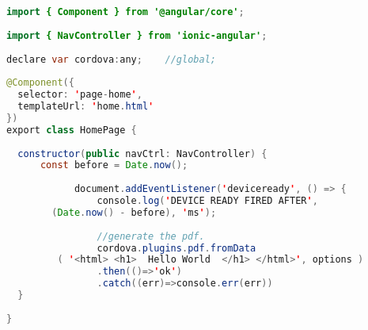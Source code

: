 \begin{lstlisting}[language= Java, frame=single, label={example:pdf-gen}, caption= Penggunaan \textit{plugin} pada Ionic dan Angular]
import { Component } from '@angular/core';
 
import { NavController } from 'ionic-angular';
 
declare var cordova:any;    //global;
 
@Component({
  selector: 'page-home',
  templateUrl: 'home.html'
})
export class HomePage {
 
  constructor(public navCtrl: NavController) {
      const before = Date.now();
 
            document.addEventListener('deviceready', () => {
                console.log('DEVICE READY FIRED AFTER', 
		(Date.now() - before), 'ms');
 
                //generate the pdf.
                cordova.plugins.pdf.fromData
	     ( '<html> <h1>  Hello World  </h1> </html>', options )
                .then(()=>'ok')
                .catch((err)=>console.err(err))
  }
 
}
 
\end{lstlisting}

